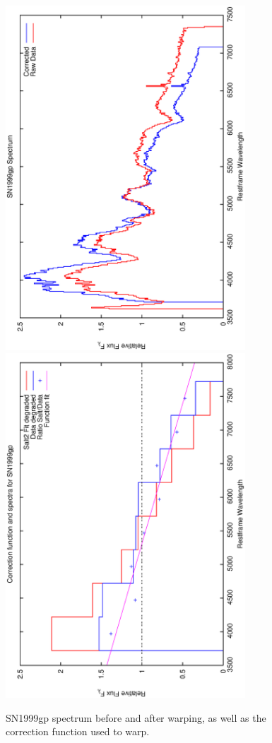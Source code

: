 \clearpage

\begin{figure}[p]
\centering
\includegraphics[angle=-90,width=0.8\textwidth]{./figures/spectrabeforeafter/SN1999gp_handpicked_v001_v024_before_after_spectra.ps}
\hfill
\includegraphics[angle=-90,width=0.8\textwidth]{./figures/corrections/SN1999gp_v001_correction.ps}
\hfill
\caption{SN1999gp spectrum before and after warping, as well as the correction function used to warp.}
\label{fig:SN1999gpfour1}
\end{figure}


